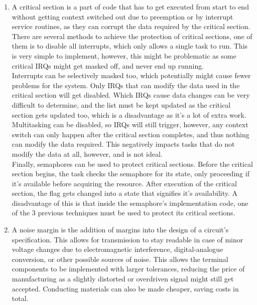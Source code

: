 \documentclass{article}
\begin{document}
\begin{enumerate}
      \item A critical section is a part of code that has to get executed from start to end without getting context switched out due to preemption or by interrupt service routines, as they can corrupt the data required by the critical section.\\
            There are several methods to achieve the protection of critical sections, one of them is to disable all interrupts, which only allows a single task to run. This is very simple to implement, however, this might be problematic as some critical IRQs might get masked off, and never end up running.\\
            Interrupts can be selectively masked too, which potentially might cause fewer problems for the system. Only IRQs that can modify the data used in the critical section will get disabled. Which IRQs cause data changes can be very difficult to determine, and the list must be kept updated as the critical section gets updated too, which is a disadvantage as it's a lot of extra work.
            Multitasking can be disabled, so IRQs will still trigger, however, any context switch can only happen after the critical section completes, and thus nothing can modify the data required. This negatively impacts tasks that do not modify the data at all, however, and is not ideal.\\
            Finally, semaphores can be used to protect critical sections. Before the critical section begins, the task checks the semaphore for its state, only proceeding if it's available before acquiring the resource. After execution of the critical section, the flag gets changed into a state that signifies it's availability. A disadvantage of this is that inside the semaphore's implementation code, one of the 3 previous techniques must be used to protect its critical sections.

      \item A noise margin is the addition of margins into the design of a circuit's specification. This allows for transmission to stay readable in case of minor voltage changes due to electromagnetic interference, digital-analogue conversion, or other possible sources of noise. This allows the terminal components to be implemented with larger tolerances, reducing the price of manufacturing as a slightly distorted or overdriven signal might still get accepted. Conducting materials can also be made cheaper, saving costs in total.


\end{enumerate}
\end{document}
